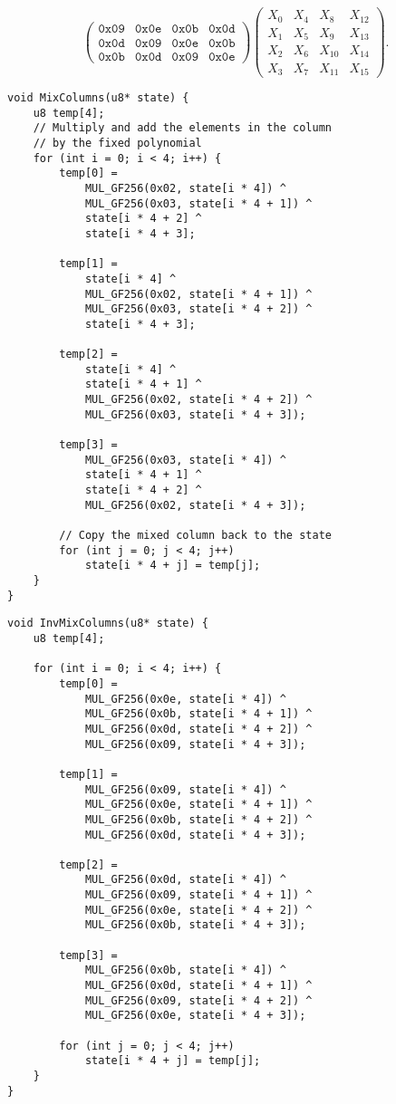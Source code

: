 \begin{itemize}
\[\begin{pmatrix}
		\texttt{0x09} & \texttt{0x0e} & \texttt{0x0b} & \texttt{0x0d}\\
		\texttt{0x0d} & \texttt{0x09} & \texttt{0x0e} & \texttt{0x0b}\\
		\texttt{0x0b} & \texttt{0x0d} & \texttt{0x09} & \texttt{0x0e}
	\end{pmatrix}\begin{pmatrix}
		X_0 & X_4 & X_8 & X_{12} \\
		X_1 & X_5 & X_9 & X_{13} \\
		X_2 & X_6 & X_{10} & X_{14} \\
		X_3 & X_7 & X_{11} & X_{15}
	\end{pmatrix}.
	\]
\end{itemize}
\begin{lstlisting}[style=C, caption={MixColumns},captionpos=t]
void MixColumns(u8* state) {
	u8 temp[4];
	// Multiply and add the elements in the column
	// by the fixed polynomial
	for (int i = 0; i < 4; i++) { 
		temp[0] =
			MUL_GF256(0x02, state[i * 4]) ^
			MUL_GF256(0x03, state[i * 4 + 1]) ^
			state[i * 4 + 2] ^
			state[i * 4 + 3]; 
		
		temp[1] =
			state[i * 4] ^
			MUL_GF256(0x02, state[i * 4 + 1]) ^
			MUL_GF256(0x03, state[i * 4 + 2]) ^
			state[i * 4 + 3];
		
		temp[2] =
			state[i * 4] ^
			state[i * 4 + 1] ^
			MUL_GF256(0x02, state[i * 4 + 2]) ^
			MUL_GF256(0x03, state[i * 4 + 3]);
		
		temp[3] =
			MUL_GF256(0x03, state[i * 4]) ^
			state[i * 4 + 1] ^
			state[i * 4 + 2] ^
			MUL_GF256(0x02, state[i * 4 + 3]);
		
		// Copy the mixed column back to the state
		for (int j = 0; j < 4; j++)
			state[i * 4 + j] = temp[j];
	}
}
\end{lstlisting}
\newpage
\begin{lstlisting}[style=C, caption={Inverse MixColumns},captionpos=t]
void InvMixColumns(u8* state) {
	u8 temp[4];
	
	for (int i = 0; i < 4; i++) { 
		temp[0] =
			MUL_GF256(0x0e, state[i * 4]) ^
			MUL_GF256(0x0b, state[i * 4 + 1]) ^
			MUL_GF256(0x0d, state[i * 4 + 2]) ^
			MUL_GF256(0x09, state[i * 4 + 3]); 
		
		temp[1] =
			MUL_GF256(0x09, state[i * 4]) ^
			MUL_GF256(0x0e, state[i * 4 + 1]) ^
			MUL_GF256(0x0b, state[i * 4 + 2]) ^
			MUL_GF256(0x0d, state[i * 4 + 3]);
		
		temp[2] =
			MUL_GF256(0x0d, state[i * 4]) ^
			MUL_GF256(0x09, state[i * 4 + 1]) ^
			MUL_GF256(0x0e, state[i * 4 + 2]) ^
			MUL_GF256(0x0b, state[i * 4 + 3]);
		
		temp[3] =
			MUL_GF256(0x0b, state[i * 4]) ^
			MUL_GF256(0x0d, state[i * 4 + 1]) ^
			MUL_GF256(0x09, state[i * 4 + 2]) ^
			MUL_GF256(0x0e, state[i * 4 + 3]);
		
		for (int j = 0; j < 4; j++)
			state[i * 4 + j] = temp[j];
	}
}
\end{lstlisting}